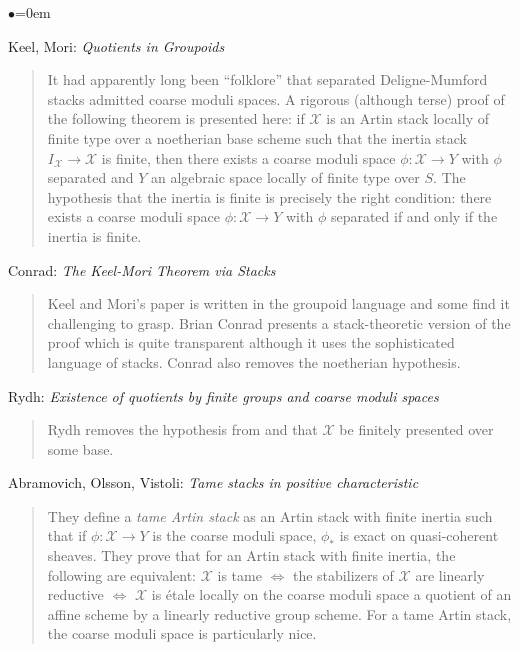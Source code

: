 \begin{list}{$\bullet$}{\leftmargin=0em}
\item Keel, Mori: \emph{Quotients in Groupoids} \cite{keel-mori}
\begin{quote}
It had apparently long been ``folklore'' that separated Deligne-Mumford stacks
admitted coarse moduli spaces. A rigorous (although terse) proof of the
following theorem is presented here: if $\mathcal{X}$ is an Artin stack
locally of
finite type over a noetherian base scheme such that the inertia stack
$I_\mathcal{X}
\to \mathcal{X}$ is finite, then there exists a coarse moduli space $\phi:
\mathcal{X} \to Y$
with $\phi$ separated and $Y$ an algebraic space locally of finite type over
$S$. The hypothesis that the inertia is finite is precisely the right
condition: there exists a coarse moduli space $\phi: \mathcal{X} \to Y$ with
$\phi$
separated if and only if the inertia is finite.
\end{quote}
\smallskip
\item Conrad: \emph{The Keel-Mori Theorem via Stacks} \cite{conrad}
\begin{quote}
Keel and Mori's paper \cite{keel-mori} is written in the groupoid language and
some find it challenging to grasp. Brian Conrad presents a stack-theoretic
version of the proof which is quite transparent although it uses the
sophisticated language of stacks. Conrad also removes the noetherian
hypothesis.
\end{quote}
\smallskip
\item Rydh: \emph{Existence of quotients by finite groups and coarse moduli
spaces} \cite{rydh_quotients}
\begin{quote}
Rydh removes the hypothesis from \cite{keel-mori} and \cite{conrad} that
$\mathcal{X}$
be finitely presented over some base.
\end{quote}
\smallskip
\item
Abramovich, Olsson, Vistoli: \emph{Tame stacks in positive characteristic}
\cite{tame}
\begin{quote}
They define a \emph{tame Artin stack} as an Artin stack with finite inertia
such that if $\phi: \mathcal{X} \to Y$ is the coarse moduli space, $\phi_*$ is
exact
on quasi-coherent sheaves. They prove that for an Artin stack with finite
inertia, the following are equivalent: $\mathcal{X}$ is tame $\iff$ the
stabilizers of
$\mathcal{X}$ are linearly reductive $\iff$ $\mathcal{X}$ is \'etale locally on
the coarse
moduli space a quotient of an affine scheme by a linearly reductive group
scheme. For a tame Artin stack, the coarse moduli space is particularly nice.

\end{quote}
\end{list}
